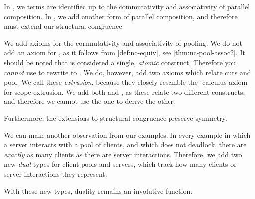 In \rcp, we terms are identified up to the commutativity and associativity of
parallel composition. In \nodcap, we add another form of parallel composition,
and therefore must extend our structural congruence:

We add axioms for the commutativity and associativity of pooling.
We do not add an axiom for , as it follows from
\cref{def:nc-equiv}, see \cref{thm:nc-pool-assoc2}.
It should be noted that  is considered a single,
\emph{atomic} construct.
Therefore you \emph{cannot} use  to rewrite
 to .
We do, however, add two axioms which relate cuts and pool.
We call these \emph{extrusion}, because they closely resemble the
\textpi-calculus axiom for scope extrusion.
We add both  and , as these relate two different
constructs, and therefore we cannot use the one to derive the other. 

Furthermore, the extensions to structural congruence preserve symmetry.

We can make another observation from our examples.
In every example in which a server interacts with a pool of clients, and which
does not deadlock, there are \emph{exactly} as many clients as there are
server interactions.
Therefore, we add two new \emph{dual} types for client pools and servers, which
track how many clients or server interactions they represent.


With these new types, duality remains an involutive function.


